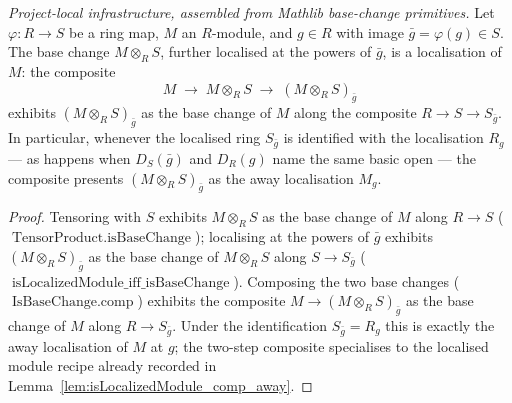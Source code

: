 \begin{lemma}\leanok
  \label{lem:isLocalizedModule_baseChange_away}
  \textit{Project-local infrastructure, assembled from Mathlib base-change primitives.}
  Let \(\varphi : R \to S\) be a ring map, \(M\) an \(R\)-module, and \(g \in R\) with image
  \(\bar g = \varphi(g) \in S\). The base change \(M \otimes_R S\), further localised at the powers of
  \(\bar g\), is a localisation of \(M\): the composite
  \[
    M \;\longrightarrow\; M \otimes_R S \;\longrightarrow\; (M \otimes_R S)_{\bar g}
  \]
  exhibits \((M \otimes_R S)_{\bar g}\) as the base change of \(M\) along the composite
  \(R \to S \to S_{\bar g}\). In particular, whenever the localised ring \(S_{\bar g}\) is identified
  with the localisation \(R_g\) --- as happens when \(D_S(\bar g)\) and \(D_R(g)\) name the same basic
  open --- the composite presents \((M \otimes_R S)_{\bar g}\) as the away localisation \(M_g\).
\end{lemma}
\begin{proof}
  \leanok
  Tensoring with \(S\) exhibits \(M \otimes_R S\) as the base change of \(M\) along \(R \to S\)
  (\(\operatorname{TensorProduct.isBaseChange}\)); localising at the powers of \(\bar g\) exhibits
  \((M \otimes_R S)_{\bar g}\) as the base change of \(M \otimes_R S\) along \(S \to S_{\bar g}\)
  (\(\operatorname{isLocalizedModule\_iff\_isBaseChange}\)). Composing the two base changes
  (\(\operatorname{IsBaseChange.comp}\)) exhibits the composite \(M \to (M \otimes_R S)_{\bar g}\) as the
  base change of \(M\) along \(R \to S_{\bar g}\). Under the identification \(S_{\bar g} = R_g\) this is
  exactly the away localisation of \(M\) at \(g\); the two-step composite specialises to the localised
  module recipe already recorded in Lemma~\ref{lem:isLocalizedModule_comp_away}.
\end{proof}

